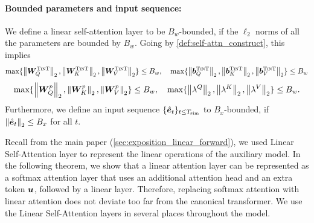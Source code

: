 
\paragraph{Bounded parameters and input sequence: } We define a linear self-attention layer to be $B_w$-bounded, if the $\ell_2$ norms of all the parameters are bounded by $B_w$. Going by \cref{def:self-attn_construct}, this implies $$\max \{ \left\| {{\bm{W}}}^{\textsc{TinT}}_Q \right\| _2,  \left\| {{\bm{W}}}^{\textsc{TinT}}_K \right\|_2, \left\| {{\bm{W}}}^{\textsc{TinT}}_V \right\|_2 \} \le B_w , \quad \max \{\left\| {{\bm{b}}}^{\textsc{TinT}}_Q \right\| _2,  \left\| {{\bm{b}}}^{\textsc{TinT}}_K \right\|_2, \left\| {{\bm{b}}}^{\textsc{TinT}}_V \right\|_2 \} \le B_w$$  $$\max \{ \left\| {\bm{W}}_Q^p \right\| _2,  \left\| {\bm{W}}_K^p \right\|_2, \left\| {\bm{W}}_V^p\right\|_2 \} \le B_w, \quad \max \{ \left\| \lambda^Q \right\| _2,  \left\| \lambda^K \right\|_2, \left\| \lambda^V \right\|_2  \}  \le B_w.$$ Furthermore, we define an input sequence $\{ \Hat{\ve}_t \}_{t \le \simu{T}}$ to $B_x$-bounded, if $\norm{\Hat{\ve}_t}_2 \le B_x$ for all $t$.

Recall from the main paper (\cref{sec:exposition_linear_forward}), we used Linear \simulator{} Self-Attention layer to represent the linear operations of the auxiliary model.
In the following theorem, we show that a linear attention layer can be represented as a softmax attention layer that uses an additional attention head and an extra token ${\bm{u}}$, followed by a linear layer. 
Therefore, replacing softmax attention with linear attention does not deviate too far from the canonical transformer.
We use the Linear \simulator{} Self-Attention layers in several places throughout the model.

